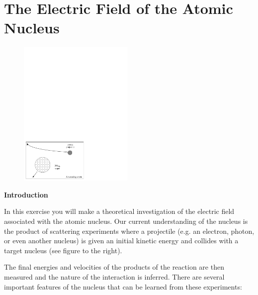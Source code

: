\section{The Electric Field of the Atomic Nucleus}

\makelabheader %

\begin{figure}
    \includegraphics[width=0.49\textwidth]{electric_field_atomic_nucleus/electric_field_atomic_nuleus_fig_1.pdf}
\end{figure}

\bigskip
\textbf{Introduction}

 
In this exercise you will make a theoretical investigation of the
electric field associated with the atomic nucleus. Our current understanding
of the nucleus is the product of scattering experiments where a projectile
(e.g. an electron, photon, or even another nucleus) is given an initial
kinetic energy and collides with a target nucleus (see figure to the right). 


The final energies and velocities of the products of the reaction
are then measured and the nature of the interaction is inferred. There
are several important features of the nucleus that can be learned
from these experiments:

